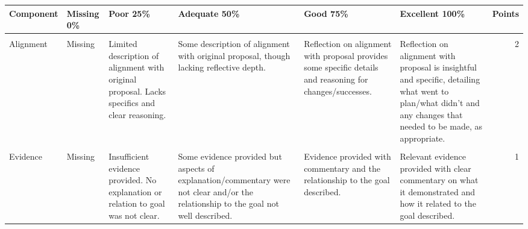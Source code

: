 \documentclass[
  openany]{book}
\begin{document}
\begin{table}
\centering\begingroup\fontsize{8}{10}\selectfont

\begin{tabular}{l>{\raggedright\arraybackslash}p{12em}>{\raggedright\arraybackslash}p{12em}>{\raggedright\arraybackslash}p{12em}>{\raggedright\arraybackslash}p{12em}>{\raggedright\arraybackslash}p{12em}r}
\toprule
Component & Missing 0\% & Poor 25\% & Adequate 50\% & Good 75\% & Excellent 100\% & Points\\
\midrule
\cellcolor{gray!6}{Activity description} & \cellcolor{gray!6}{Missing} & \cellcolor{gray!6}{Limited description of task, insufficient detail to understand the scope of activity.} & \cellcolor{gray!6}{Some description of the activity, but too general and/or would require the reader to have some previous knowledge of the goal/activity chosen to fully under it.} & \cellcolor{gray!6}{Mostly clear description of activity but lacking some specificity or does not fully introduce the task for a reader with no previous knowledge of the tasks.} & \cellcolor{gray!6}{Clear and specific description of the activity undertaken.  Appropriately introduced for a reader with no background knowledge of the task.} & \cellcolor{gray!6}{2}\\
Alignment & Missing & Limited description of alignment with original proposal. Lacks specifics and clear reasoning. & Some description of alignment with original proposal, though lacking reflective depth. & Reflection on alignment with proposal provides some specific details and reasoning for changes/successes. & Reflection on alignment with proposal is insightful and specific, detailing what went to plan/what didn’t and any changes that needed to be made, as appropriate. & 2\\
\cellcolor{gray!6}{SMART goal-setting lessons} & \cellcolor{gray!6}{Missing} & \cellcolor{gray!6}{Limited description of lessons learned from the SMART goal setting approach.} & \cellcolor{gray!6}{Some description of lessons learned from the SMART goal setting approach, though lacking reflective depth.} & \cellcolor{gray!6}{Reflection on lessons learned from the SMART goal setting approach provides some specific details} & \cellcolor{gray!6}{Reflection on lessons learned from the SMART goal setting approach is insightful and specific.} & \cellcolor{gray!6}{2}\\
Evidence & Missing & Insufficient evidence provided. No explanation or relation to goal was not clear. & Some evidence provided but aspects of explanation/commentary were not clear and/or the relationship to the goal not well described. & Evidence provided with commentary and the relationship to the goal described. & Relevant evidence provided with clear commentary on what it demonstrated and how it related to the goal described. & 1\\

\end{tabular}
\end{table}
\end{document}
